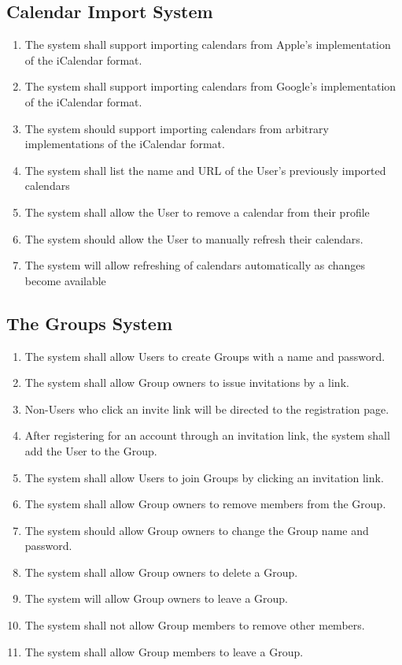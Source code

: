 \documentclass{scrreprt}
\begin{document}
\subsection{Calendar Import System}
    \begin{enumerate}
    \item The system shall support importing calendars from Apple’s implementation of the iCalendar format.
    \item The system shall support importing calendars from Google’s implementation of the iCalendar format.
    \item The system should support importing calendars from arbitrary implementations of the iCalendar format.
    \item The system shall list the name and URL of the User’s previously imported calendars
    \item The system shall allow the User to remove a calendar from their profile
    \item The system should allow the User to manually refresh their calendars.
    \item The system will allow refreshing of calendars automatically as changes become available
    \end{enumerate}

\subsection{The Groups System}
    \begin{enumerate}
    \item The system shall allow Users to create Groups with a name and password.
    \item The system shall allow Group owners to issue invitations by a link.
    \item Non-Users who click an invite link will be directed to the registration page.
    \item After registering for an account through an invitation link, the system shall add the User to the Group.
    \item The system shall allow Users to join Groups by clicking an invitation link.
    \item The system shall allow Group owners to remove members from the Group.
    \item The system should allow Group owners to change the Group name and password.
    \item The system shall allow Group owners to delete a Group.
    \item The system will allow Group owners to leave a Group.
    \item The system shall not allow Group members to remove other members.
    \item The system shall allow Group members to leave a Group.
    \end{enumerate}
\end{document}
